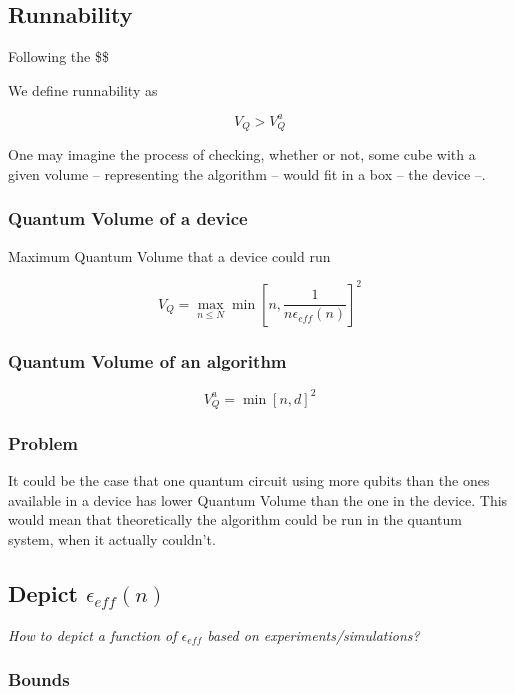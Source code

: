 \documentclass[11pt]{article}
\begin{document}
\subsection{Runnability}
\label{sec:orgc7a842b}

Following the \$\$

We define runnability as 

$$V_Q > V_Q^a$$

One may imagine the process of checking, whether or not, some cube with a given volume -- representing the algorithm -- would fit in a box -- the device --.

\subsubsection{Quantum Volume of a device}
\label{sec:org81b829e}

Maximum Quantum Volume that a device could run

$$V_Q = \max_{n \le N} \min \left[ n,\frac{1}{n \epsilon_{eff} (n)}\right]^2$$

\subsubsection{Quantum Volume of an algorithm}
\label{sec:org185527b}

$$V_Q^a = \min \left[ n,d \right]^2$$

\subsubsection{Problem}
\label{sec:orga00ba89}

It could be the case that one quantum circuit using more qubits than the ones available in a device has lower Quantum Volume than the one in the device. This would mean that theoretically the algorithm could be run in the quantum system, when it actually couldn't.

\subsection{Depict \(\epsilon_{eff}(n)\)}
\label{sec:orgcf3149a}

\emph{How to depict a function of \(\epsilon_{eff}\) based on experiments/simulations?}

\subsubsection{Bounds}
\label{sec:org50bdc70}
\end{document}
